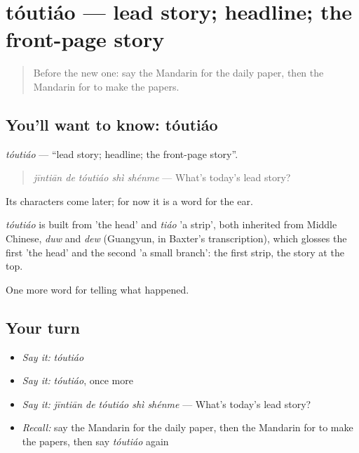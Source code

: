 \section[tóutiáo]{tóutiáo — lead story; headline; the front-page story}

\label{lesson:ZH-C293-toutiao}



\begin{quote}
Before the new one: say the Mandarin for the daily paper, then the Mandarin for to make the papers.
\end{quote}

\subsection*{You'll want to know: tóutiáo}
\emph{tóutiáo} — \textquotedblleft{}lead story; headline; the front-page story\textquotedblright{}.

\begin{quote}
\emph{jīntiān de tóutiáo shì shénme} — What's today's lead story?
\end{quote}

Its characters come later; for now it is a word for the ear.

\begin{cousinweb}
\emph{tóutiáo} is built from  'the head' and \emph{tiáo} 'a strip', both inherited from Middle Chinese, \emph{duw} and \emph{dew} (Guangyun, in Baxter's transcription), which glosses the first 'the head' and the second 'a small branch': the first strip, the story at the top.
\end{cousinweb}

\begin{grammarlens}[title={What you've built}]
One more word for telling what happened.
\end{grammarlens}

\subsection*{Your turn}
\begin{itemize}
\raggedright
  \item \emph{Say it:} \emph{tóutiáo}
  \item \emph{Say it:} \emph{tóutiáo}, once more
  \item \emph{Say it:} \emph{jīntiān de tóutiáo shì shénme} — What's today's lead story?
  \item \emph{Recall:} say the Mandarin for the daily paper, then the Mandarin for to make the papers, then say \emph{tóutiáo} again
\end{itemize}

